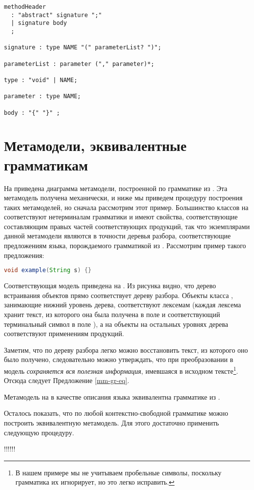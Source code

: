 \begin{lstlisting}[language=ANTLR,float,label=java-method-header,caption=Упрощенный синтаксис описания методов в языке \tool{Java}.]
methodHeader
  : "abstract" signature ";"
  | signature body
  ;

signature : type NAME "(" parameterList? ")";
  
parameterList : parameter ("," parameter)*;
  
type : "void" | NAME;
  
parameter : type NAME;
  
body : "{" "}" ;
\end{lstlisting}


\section{Метамодели, эквивалентные грамматикам}

На  приведена диаграмма метамодели, построенной по грамматике из . Эта метамодель получена механически, и ниже мы приведем процедуру построения таких метамоделей, но сначала рассмотрим этот пример. Большинство классов на  соответствуют нетерминалам грамматики и имеют свойства, соответствующие составляющим правых частей соответствующих продукций, так что экземплярами данной метамодели являются в точности деревья разбора, соответствующие предложениям языка, порождаемого грамматикой из . Рассмотрим пример такого предложения:
\begin{lstlisting}[language=Java]
void example(String s) {}
\end{lstlisting}
Соответствующая модель приведена на .
Из рисунка видно, что дерево встраивания объектов прямо соответствует дереву разбора. Объекты класса , занимающие нижний уровень дерева, соответствуют лексемам (каждая лексема хранит текст, из которого она была получена в поле  и соответствующий терминальный символ в поле ), а на объекты на остальных уровнях дерева соответствуют применениям продукций.

Заметим, что по дереву разбора легко можно восстановить текст, из которого оно было получено, следовательно можно утверждать, что при преобразовании в модель \emph{сохраняется вся полезная информация}, имевшаяся в исходном тексте\footnote{В нашем примере мы не учитываем пробельные символы, поскольку грамматика их игнорирует, но это легко исправить.}. Отсюда следует Предложение \ref{mm-gr-eq}.
\begin{Prop}\label{mm-gr-eq}
Метамодель на  в качестве описания языка эквивалентна грамматике из .
\end{Prop}

Осталось показать, что по любой контекстно-свободной грамматике можно построить эквивалентную метамодель. Для этого достаточно применить следующую процедуру.

!!!!!!

